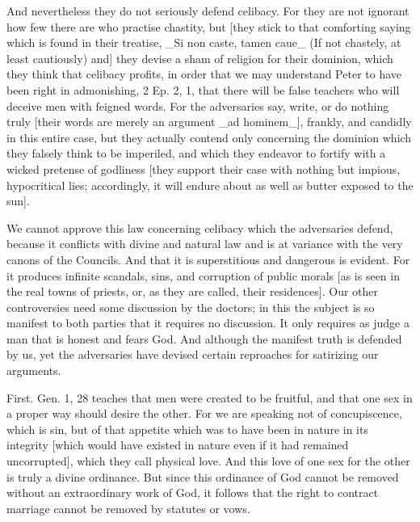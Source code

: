 And nevertheless they do not seriously defend celibacy.  For they are
not ignorant how few there are who practise chastity, but [they stick
to that comforting saying which is found in their treatise, _Si non
caste, tamen caue_ (If not chastely, at least cautiously) and] they
devise a sham of religion for their dominion, which they think that
celibacy profits, in order that we may understand Peter to have been
right in admonishing, 2 Ep. 2, 1, that there will be false teachers
who will deceive men with feigned words.  For the adversaries say,
write, or do nothing truly [their words are merely an argument _ad
hominem_], frankly, and candidly in this entire case, but they
actually contend only concerning the dominion which they falsely
think to be imperiled, and which they endeavor to fortify with a
wicked pretense of godliness [they support their case with nothing
but impious, hypocritical lies; accordingly, it will endure about as
well as butter exposed to the sun].

We cannot approve this law concerning celibacy which the adversaries
defend, because it conflicts with divine and natural law and is at
variance with the very canons of the Councils.  And that it is
superstitious and dangerous is evident.  For it produces infinite
scandals, sins, and corruption of public morals [as is seen in the
real towns of priests, or, as they are called, their residences].
Our other controversies need some discussion by the doctors; in this
the subject is so manifest to both parties that it requires no
discussion.  It only requires as judge a man that is honest and fears
God.  And although the manifest truth is defended by us, yet the
adversaries have devised certain reproaches for satirizing our
arguments.

First.  Gen. 1, 28 teaches that men were created to be fruitful, and
that one sex in a proper way should desire the other.  For we are
speaking not of concupiscence, which is sin, but of that appetite
which was to have been in nature in its integrity [which would have
existed in nature even if it had remained uncorrupted], which they
call physical love.  And this love of one sex for the other is truly
a divine ordinance.  But since this ordinance of God cannot be
removed without an extraordinary work of God, it follows that the
right to contract marriage cannot be removed by statutes or vows.

